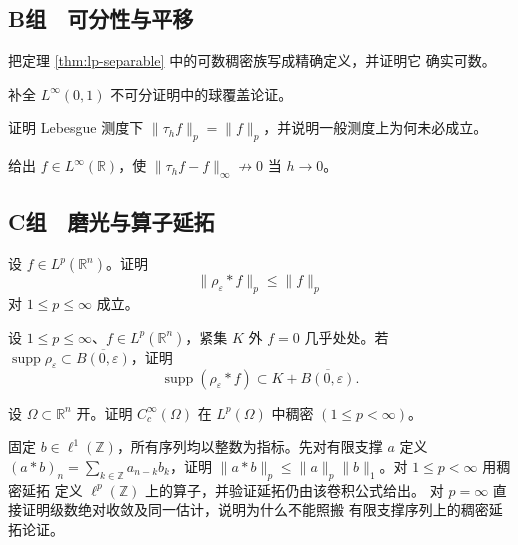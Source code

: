 \subsection*{B组　可分性与平移}
\begin{enumerate}[label=\textbf{\thechapter.\arabic*.},resume]
把定理 \ref{thm:lp-separable} 中的可数稠密族写成精确定义，并证明它
确实可数。

补全 \(L^\infty(0,1)\) 不可分证明中的球覆盖论证。

证明 Lebesgue 测度下
\(\|\tau_hf\|_p=\|f\|_p\)，并说明一般测度上为何未必成立。

给出 \(f\in L^\infty(\mathbb R)\)，使
\(\|\tau_hf-f\|_\infty\not\to0\) 当 \(h\to0\)。

\end{enumerate}
\subsection*{C组　磨光与算子延拓}
\begin{enumerate}[label=\textbf{\thechapter.\arabic*.},resume]
设 \(f\in L^p(\mathbb R^n)\)。证明
\[
 \|\rho_\varepsilon*f\|_p\le\|f\|_p
\]
对 \(1\le p\le\infty\) 成立。

设 \(1\le p\le\infty\)、\(f\in L^p(\mathbb R^n)\)，紧集 \(K\) 外
\(f=0\) 几乎处处。若
\(\operatorname{supp}\rho_\varepsilon\subset\overline{B(0,\varepsilon)}\)，证明
\[
 \operatorname{supp}(\rho_\varepsilon*f)
 \subset K+\overline{B(0,\varepsilon)}.
\]

设 \(\Omega\subset\mathbb R^n\) 开。证明
\(C_c^\infty(\Omega)\) 在 \(L^p(\Omega)\) 中稠密
\((1\le p<\infty)\)。

固定 \(b\in\ell^1(\mathbb Z)\)，所有序列均以整数为指标。先对有限支撑
\(a\) 定义 \((a*b)_n=\sum_{k\in\mathbb Z}a_{n-k}b_k\)，证明
\(\|a*b\|_p\le\|a\|_p\|b\|_1\)。对 \(1\le p<\infty\) 用稠密延拓
定义 \(\ell^p(\mathbb Z)\) 上的算子，并验证延拓仍由该卷积公式给出。
对 \(p=\infty\) 直接证明级数绝对收敛及同一估计，说明为什么不能照搬
有限支撑序列上的稠密延拓论证。
\end{enumerate}
